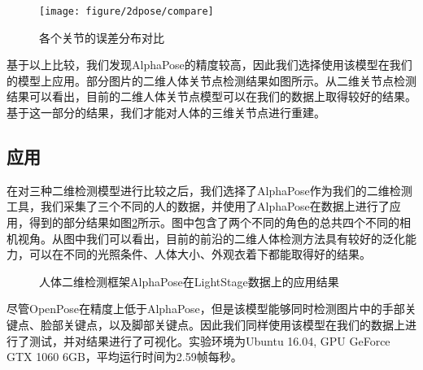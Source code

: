 \begin{figure}[htbp]
    \centering
    \texttt{[image: figure/2dpose/compare]}
    \caption{\label{fig:2d-loss} 各个关节的误差分布对比}
\end{figure}

基于以上比较，我们发现AlphaPose的精度较高，因此我们选择使用该模型在我们的模型上应用。部分图片的二维人体关节点检测结果如图所示。从二维关节点检测结果可以看出，目前的二维人体关节点模型可以在我们的数据上取得较好的结果。基于这一部分的结果，我们才能对人体的三维关节点进行重建。


\subsection{应用}
在对三种二维检测模型进行比较之后，我们选择了AlphaPose作为我们的二维检测工具，我们采集了三个不同的人的数据，并使用了AlphaPose在数据上进行了应用，得到的部分结果如图\ref{fig:ls2d}所示。图中包含了两个不同的角色的总共四个不同的相机视角。从图中我们可以看出，目前的前沿的二维人体检测方法具有较好的泛化能力，可以在不同的光照条件、人体大小、外观衣着下都能取得好的结果。

\begin{figure}[htbp]
    \centering
    \caption{人体二维检测框架AlphaPose在LightStage数据上的应用结果\label{fig:ls2d}}
\end{figure}

尽管OpenPose在精度上低于AlphaPose，但是该模型能够同时检测图片中的手部关键点、脸部关键点，以及脚部关键点。因此我们同样使用该模型在我们的数据上进行了测试，并对结果进行了可视化。实验环境为Ubuntu 16.04, GPU GeForce GTX 1060 6GB，平均运行时间为2.59帧每秒。

